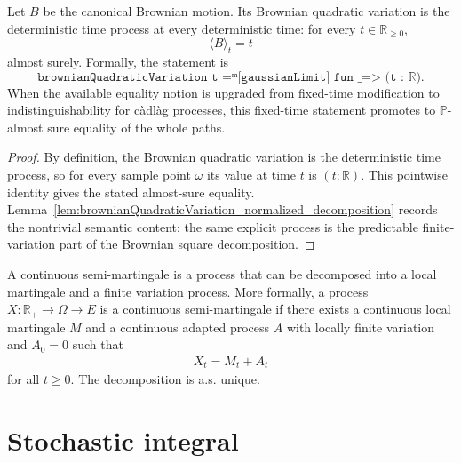 \begin{lemma}\label{lem:quadraticVariation_brownian}
  \leanok
Let \(B\) be the canonical Brownian motion. Its Brownian quadratic variation is
the deterministic time process at every deterministic time: for every
\(t\in\mathbb R_{\ge 0}\),
\[
  \langle B\rangle_t = t
\]
almost surely.  Formally, the statement is
\[
  \texttt{brownianQuadraticVariation t =ᵐ[gaussianLimit] fun \_ => (t : ℝ)}.
\]
When the available equality notion is upgraded from fixed-time modification
to indistinguishability for càdlàg processes, this fixed-time statement
promotes to \(\mathbb P\)-almost sure equality of the whole paths.
\end{lemma}

\begin{proof}

\leanok
By definition, the Brownian quadratic variation is the deterministic time
process, so for every sample point \(\omega\) its value at time \(t\) is
\((t:\mathbb R)\).  This pointwise identity gives the stated almost-sure
equality.  Lemma~\ref{lem:brownianQuadraticVariation_normalized_decomposition}
records the nontrivial semantic content: the same explicit process is the
predictable finite-variation part of the Brownian square decomposition.
\end{proof}


\begin{definition}\label{def:continuousSemiMartingale}
A continuous semi-martingale is a process that can be decomposed into a local martingale and a finite variation process.
More formally, a process $X : \mathbb{R}_+ \to \Omega \to E$ is a continuous semi-martingale if there exists a continuous local martingale $M$ and a continuous adapted process $A$ with locally finite variation and $A_0 = 0$ such that
\begin{align*}
  X_t = M_t + A_t
\end{align*}
for all $t \ge 0$.
The decomposition is a.s. unique.
\end{definition}






\section{Stochastic integral}

